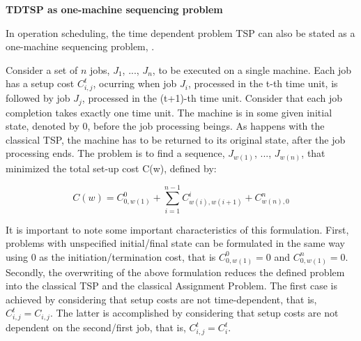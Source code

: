 \textbf{TDTSP as one-machine sequencing problem}


In operation scheduling, the time dependent problem TSP can also be stated as a 
one-machine sequencing problem, \cite{tdtsp_single_machine}.

Consider a set of $n$ jobs, $J_{1}$, ..., $J_{n}$, to be executed on a single machine.
Each job has a setup cost $C_{i,j}^{t}$, ocurring when job $J_{i}$, processed in
the t-th time unit, is followed by job $J_{j}$, processed in the (t+1)-th
time unit. Consider that each job completion takes exactly one time unit.
The machine is in some given initial state, denoted by 0, before the job processing beings.
As happens with the classical TSP, the machine has to be returned to its original
state, after the job processing ends. The problem is to find a sequence,
$J_{w(1)}$, ..., $J_{w(n)}$, that minimized the total set-up cost C(w), defined by:

\begin{equation}
  C(w) = C_{0, w(1)}^{0} + \sum_{i=1}^{n-1} C_{w(i), w(i+1)}^{i} +  C_{w(n), 0}^{n}
\end{equation}

It is important to note some important characteristics of this formulation.
First, problems with unspecified initial/final state can be formulated
in the same way using 0 as the initiation/termination cost, that is
$C_{0, w(1)}^{0} = 0$ and $C_{0, w(1)}^{n} = 0$.
Secondly, the overwriting of the above formulation reduces the defined problem
into the classical TSP and the classical Assignment Problem. The first case
is achieved by considering that setup costs are not time-dependent, that is,
$C_{i, j}^{t} = C_{i, j}$. The latter is accomplished by considering that setup costs
are not dependent on the second/first job, that is, $C_{i, j}^{t} = C_{i}^{t}$.